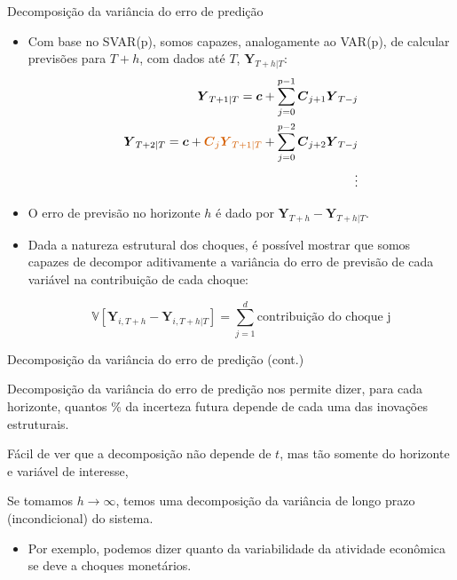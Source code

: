 \documentclass[11pt]{beamer}
\newenvironment{halfwideitemize}{\itemize\addtolength{\itemsep}{0.5em}}{\enditemize}
\begin{document}
\begin{frame}{Decomposição da variância do erro de predição}
		\begin{itemize}
		\item Com base no SVAR(p), somos capazes, analogamente ao VAR(p), de calcular previsões para $T+h$, com dados até $T$, $\boldsymbol{Y}_{T+h|T}$:
		\begin{align*}
			\boldsymbol{Y}_{T+1|T} = \boldsymbol{c} + \sum_{j=0}^{p-1} \boldsymbol{C}_{j+1} \boldsymbol{Y}_{T-j} \\
				\boldsymbol{Y}_{T+2|T} = \boldsymbol{c} +  {\color{red}\boldsymbol{C}_{j}\boldsymbol{Y}_{T+1|T}} +  \sum_{j=0}^{p-2} \boldsymbol{C}_{j+2} \boldsymbol{Y}_{T-j}  \\
				\vdots
		\end{align*}
	\end{itemize}
	\begin{itemize}
\item O erro de previsão no horizonte $h$ é dado por $\boldsymbol{Y}_{T+h} - \boldsymbol{Y}_{T+h|T}$.
\item Dada a natureza estrutural dos choques, é possível mostrar que somos capazes de decompor aditivamente a {\color{blue}variância do erro de previsão de cada variável} na contribuição de cada choque:

$$\mathbb{V}[\boldsymbol{Y}_{i,T+h} - \boldsymbol{Y}_{i, T+h|T}] = \sum_{j=1}^d \text{contribuição do choque j}$$
	\end{itemize}
\end{frame}

\begin{frame}{Decomposição da variância do erro de predição (cont.)}
	\begin{halfwideitemize}

		\item Decomposição da variância do erro de predição nos permite dizer, para cada horizonte, quantos \% da incerteza futura depende de cada uma das inovações estruturais.
				\item Fácil de ver que a decomposição não depende de $t$, mas tão somente do horizonte e variável de interesse,
		\item Se tomamos $h \to \infty$, temos uma decomposição da variância de longo prazo (incondicional) do sistema.
		\begin{itemize}
			\item Por exemplo, podemos dizer quanto da variabilidade da atividade econômica se deve a choques monetários.
		\end{itemize}
	\end{halfwideitemize}
\end{frame}
\end{document}
